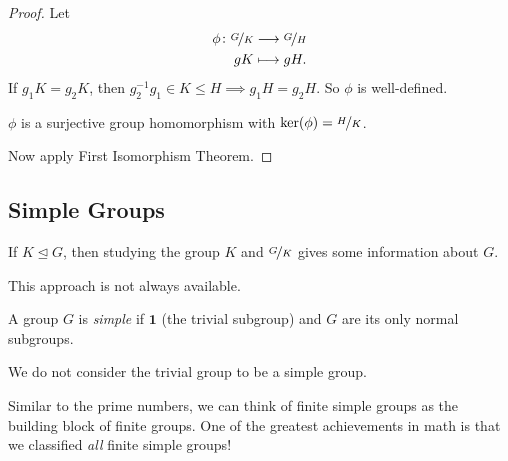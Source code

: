 \begin{proof}
    Let
    \begin{equation*}
    \begin{aligned}
      \phi\colon \nicefrac{G}{K} & \longrightarrow \nicefrac{G}{H}      \\
      gK          & \longmapsto gH.
    \end{aligned}
    \end{equation*}
    If \(g_1 K = g_2 K\), then \(g_2^{-1} g_1 \in K \leq  H\implies g_{1} H = g_2 H\). So \(\phi\) is well-defined.

    \(\phi\) is a surjective group homomorphism with \(\ker(\phi) = \nicefrac{H}{K}\).

    Now apply First Isomorphism Theorem.
\end{proof}

\subsection{Simple Groups}
If \(K \trianglelefteq G\), then studying the group \(K\) and \(\nicefrac{G}{K}\) gives some information about \(G\).

This approach is not always available.
\begin{definition}
    A group \(G\) is \textit{simple} if \(\textbf{1} \) (the trivial subgroup) and \(G\) are its only normal subgroups.
\end{definition}
\begin{notation}
    We do not consider the trivial group to be a simple group.
\end{notation}
Similar to the prime numbers, we can think of finite simple groups as the building block of finite groups. One of the greatest achievements in math is that we classified \textit{all} finite simple groups!

